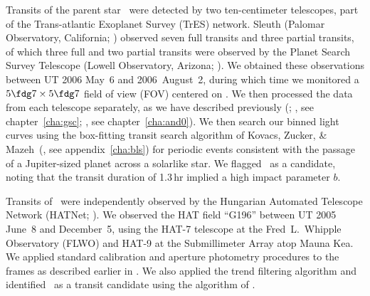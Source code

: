 Transits of the parent star \gscOTO\ were detected by two ten-centimeter telescopes, part of the Trans-atlantic Exoplanet Survey (TrES) network.
Sleuth (Palomar Observatory, California; \citealt{ODonovan_Charbonneau_Kotredes:AIP:2004a}) observed seven full transits and three partial transits, of which three full and two partial transits were observed by the Planet Search Survey Telescope (Lowell Observatory, Arizona; \citealt{Dunham_Mandushev_Taylor:pasp:2004a}).
We obtained these observations between UT 2006 May~6 and 2006~August~2, during which time we monitored a \mbox{$5\fdg7\times5\fdg7$} field of view (FOV) centered on \thetaher.
We then processed the data from each telescope separately, as we have described previously (\citealp{Dunham_Mandushev_Taylor:pasp:2004a}; \citealp{ODonovan_Charbonneau_Torres:apj:2006a}, see chapter~\ref{cha:gsc}; \citealp{ODonovan_Charbonneau_Alonso:apj:2007a}, see chapter~\ref{cha:and0}).
We then search our binned light curves using the box-fitting transit search algorithm of Kovacs, Zucker, \& Mazeh~(\citeyear{Kovacs_Zucker_Mazeh:aa:2002a}, see appendix~\ref{cha:bls}) for periodic events consistent with the passage of a Jupiter-sized planet across a solarlike star.
We flagged \tresThree\ as a candidate, noting that the transit duration of 1.3\,hr implied a high impact parameter $b$.

Transits of \tresThree\ were independently observed by the Hungarian Automated Telescope Network (HATNet; \citealt{Bakos_Noyes_Kovacs:pasp:2004a}).
We observed the HAT field ``G196'' between UT 2005 June~8 and December~5, using the \mbox{HAT-7} telescope at the Fred~L.\ Whipple Observatory (FLWO) and \mbox{HAT-9} at the Submillimeter Array atop Mauna Kea.
We applied standard calibration and aperture photometry procedures to the frames as described earlier in \citet{Bakos_Noyes_Kovacs:apj:2007a}.
We also applied the trend filtering algorithm \citep{Kovacs_Bakos_Noyes:mnras:2005a} and identified \tresThree\ as a transit candidate using the algorithm of \citet{Kovacs_Zucker_Mazeh:aa:2002a}.

